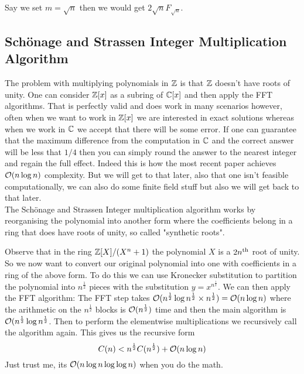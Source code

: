 Say we set $m = \sqrt{n}$ then we would get $2\sqrt{n}F_{\sqrt{n}}$.

\subsection{Sch\"{o}nage and Strassen Integer Multiplication Algorithm}
\label{subsec:schon-strass}

The problem with multiplying polynomials in ${\mathbb Z}$ is that ${\mathbb Z}$ doesn't have roots of unity. One can consider ${\mathbb Z}[x]$ as a subring of $\mathbb{C}[x]$ and then apply the FFT algorithms. That is perfectly valid and does work in many scenarios however, often when we want to work in ${\mathbb Z}[x]$ we are interested in exact solutions whereas when we work in $\mathbb{C}$ we accept that there will be some error. If one can guarantee that the maximum difference from the computation in $\mathbb{C}$ and the correct answer will be less that $1/4$ then you can simply round the answer to the nearest integer and regain the full effect. Indeed this is how the most recent paper achieves $\mathcal O(n\log n)$ complexity. But we will get to that later, also that one isn't feasible computationally, we can also do some finite field stuff but also we will get back to that later.\\
The Sch\"{o}nage and Strassen Integer multiplication algorithm works by reorganising the polynomial into another form where the coefficients belong in a ring that does have roots of unity, so called "synthetic roots".

Observe that in the ring ${\mathbb Z}[X] / (X^n + 1)$ the polynomial $X$ is a $2n^{\textrm{th}}$ root of unity. So we now want to convert our original polynomial into one with coefficients in a ring of the above form. To do this we can use Kronecker substitution to partition the polynomial into $n^{\frac{1}{2}}$ pieces with the substitution $y = x^{n^{\frac{1}{2}}}$. We can then apply the FFT algorithm: The FFT step takes $\mathcal O(n^{\frac{1}{2}}\log n^{\frac{1}{2}} \times n^{\frac{1}{2}}) = \mathcal O(n \log n)$ where the arithmetic on the $n^{\frac{1}{2}}$ blocks is $\mathcal O(n^{\frac{1}{2}})$ time and then the main algorithm is $\mathcal O(n^{\frac{1}{2}}\log n^{\frac{1}{2}}$. Then to perform the elementwise multiplications we recursively call the algorithm again. This gives us the recursive form
\[
    C(n) < n^{\frac{1}{2}}C(n^{\frac{1}{2}}) + \mathcal O(n \log n)
\]
Just trust me, its $\mathcal O(n \log n \log \log n)$ when you do the math.

